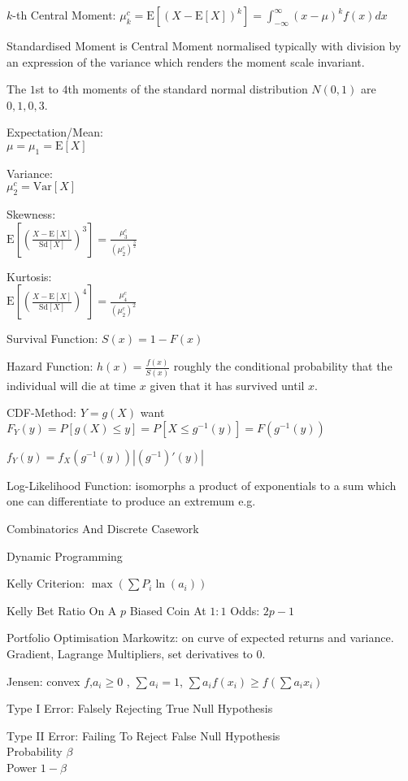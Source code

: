 $k$-th Central Moment: $\mu_k^c=\text{E}[(X-\text{E}[X])^k]=\int_{-\infty}^{\infty} (x-\mu)^k f(x) dx$

Standardised Moment is Central Moment normalised typically with division by an expression of the variance which renders the moment scale invariant.

The $1$st to $4$th moments of the standard normal distribution $N(0,1)$ are $0,1,0,3$.

Expectation/Mean: \\
$\mu=\mu_1=\text{E}[X]$

Variance: \\
$\mu_2^c=\text{Var}[X]$

Skewness: \\
$\text{E}\left[ \left( \frac{X-\text{E}[X]}{\text{Sd}[X]} \right)^3\right]=\frac{\mu_3^c}{(\mu_2^c)^{\frac{3}{2}}}$

Kurtosis: \\
$\text{E}\left[ \left( \frac{X-\text{E}[X]}{\text{Sd}[X]} \right)^4\right]=\frac{\mu_4^c}{(\mu_2^c)^2}$

Survival Function: $S(x)=1-F(x)$

Hazard Function: $h(x)=\frac{f(x)}{S(x)}$ roughly the conditional probability that the individual will die at time $x$ given that it has survived until $x$.

CDF-Method: $Y=g(X)$ want $F_Y(y)=P[g(X)\le y]=P[X\le g^{-1}(y)]=F(g^{-1}(y))$

$f_Y(y)=f_X(g^{-1}(y))|(g^{-1})'(y)|$

Log-Likelihood Function: isomorphs a product of exponentials to a sum which one can differentiate to produce an extremum e.g.

Combinatorics And Discrete Casework

Dynamic Programming

Kelly Criterion: $\max\left( \sum P_i \ln(a_i)\right)$

Kelly Bet Ratio On A $p$ Biased Coin At $1:1$ Odds: $2p-1$

Portfolio Optimisation Markowitz: on curve of expected returns and variance. Gradient, Lagrange Multipliers, set derivatives to $0$.

Jensen: convex $f$,$a_i \ge 0$ , $\sum a_i = 1$, $\sum a_i f(x_i) \ge f\left(\sum a_i x_i \right)$

Type I Error: Falsely Rejecting True Null Hypothesis

Type II Error: Failing To Reject False Null Hypothesis \\
Probability $\beta$ \\
Power $1-\beta$

